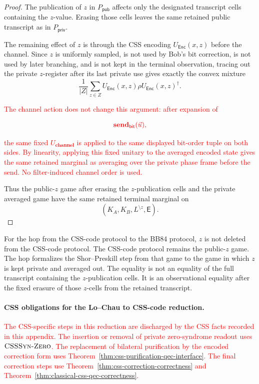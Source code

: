 \documentclass[acmsmall,screen,review,anonymous,nonacm]{acmart}
\theoremstyle{defn_style}
\begin{document}
\begin{proof}
The publication of \(z\) in \(P_{\mathsf{pub}}\) affects only the designated
transcript cells containing the \(z\)-value.  Erasing those cells leaves the
same retained public transcript as in \(P_{\mathsf{priv}}\).

The remaining effect of \(z\) is through the CSS encoding
\(U_{\mathsf{Enc}}(x,z)\) before the channel.  Since \(z\) is uniformly sampled,
is not used by Bob's bit correction, is not used by later branching, and is not
kept in the terminal observation, tracing out the private \(z\)-register after
its last private use gives exactly the convex mixture
\[
\frac1{|Z|}
\sum_{z\in Z}
U_{\mathsf{Enc}}(x,z)\rho U_{\mathsf{Enc}}(x,z)^\dagger .
\]

\textcolor{red}{The channel action does not change this argument: after expansion of}

\[
\textcolor{red}{
\mathbf{send}_{\mathsf{bit}}(\vec u),
}
\]

\textcolor{red}{the same fixed \(U_{\textbf{channel}}\) is applied to the same displayed
bit-order tuple on both sides. By linearity, applying this fixed unitary to
the averaged encoded state gives the same retained marginal as averaging
over the private phase frame before the send. No filter-induced channel
order is used.}

Thus the public-\(z\) game after erasing the \(z\)-publication cells and the
private averaged game have the same retained terminal marginal on
\[
(K_A,K_B,L^{\setminus z},\mathsf E).
\]
\end{proof}

For the hop from the CSS-code protocol to the BB84 protocol, \(z\) is not
deleted from the CSS-code protocol.  The CSS-code protocol remains the
public-\(z\) game.  The hop formalizes the Shor--Preskill step from that game
to the game in which \(z\) is kept private and averaged out.  The equality is
not an equality of the full transcript containing the \(z\)-publication cells.
It is an observational equality after the fixed erasure of those \(z\)-cells
from the retained transcript.

\paragraph{CSS obligations for the Lo--Chau to CSS-code reduction.}

\textcolor{red}{The CSS-specific steps in this reduction are discharged by the CSS facts
recorded in this appendix. The insertion or removal of private
zero-syndrome readout uses \(\textsc{CSSSyn-Zero}\). The replacement of
bilateral purification by the encoded correction form uses
Theorem~\ref{thm:css-purification-qec-interface}. The final correction
steps use Theorem~\ref{thm:css-correction-correctness} and
Theorem~\ref{thm:classical-css-qec-correctness}.}
\end{document}
